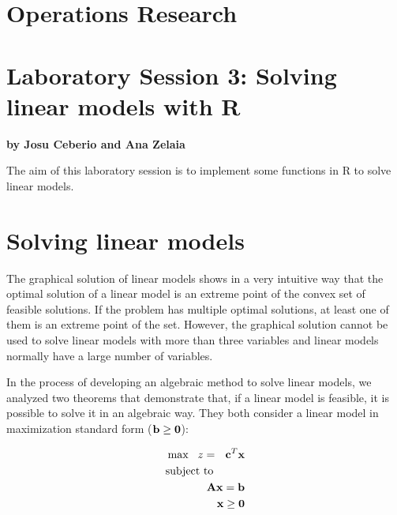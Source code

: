 \documentclass[
]{article}
\author{}
\date{\vspace{-2.5em}}
\begin{document}
\hypertarget{operations-research}{%
\section{Operations Research}\label{operations-research}}

\hypertarget{laboratory-session-3-solving-linear-models-with-r}{%
\section{Laboratory Session 3: Solving linear models with
R}\label{laboratory-session-3-solving-linear-models-with-r}}

\textbf{by Josu Ceberio and Ana Zelaia}

The aim of this laboratory session is to implement some functions in R
to solve linear models.

\hypertarget{solving-linear-models}{%
\section{Solving linear models}\label{solving-linear-models}}

The graphical solution of linear models shows in a very intuitive way
that the optimal solution of a linear model is an extreme point of the
convex set of feasible solutions. If the problem has multiple optimal
solutions, at least one of them is an extreme point of the set. However,
the graphical solution cannot be used to solve linear models with more
than three variables and linear models normally have a large number of
variables.

In the process of developing an algebraic method to solve linear models,
we analyzed two theorems that demonstrate that, if a linear model is
feasible, it is possible to solve it in an algebraic way. They both
consider a linear model in maximization standard form
(\({\bf b}\geq {\bf 0}\)):

\vspace{-0.5cm}

\begin{eqnarray*}
\max\ \ z= \ \ {\bf c}^{T}{\bf x} \\
\mbox{subject to}\hspace{1cm}\\
{\bf A}{\bf x} = {\bf b} \\
{\bf x} \geq {\bf 0}
\end{eqnarray*}

\vspace{-0.5cm}
\end{document}
